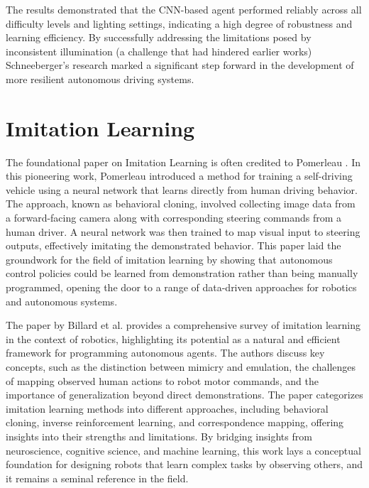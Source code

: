 The results demonstrated that the CNN-based agent performed reliably across all difficulty levels and lighting settings, indicating a high degree of robustness and learning efficiency. By successfully addressing the limitations posed by inconsistent illumination (a challenge that had hindered earlier works) Schneeberger’s \autocite{schneeberger2024end} research marked a significant step forward in the development of more resilient autonomous driving systems.

\section{Imitation Learning}
The foundational paper on Imitation Learning is often credited to Pomerleau \autocite{NIPS1988_812b4ba2}. In this pioneering work, Pomerleau introduced a method for training a self-driving vehicle using a neural network that learns directly from human driving behavior. The approach, known as behavioral cloning, involved collecting image data from a forward-facing camera along with corresponding steering commands from a human driver. A neural network was then trained to map visual input to steering outputs, effectively imitating the demonstrated behavior. This paper laid the groundwork for the field of imitation learning by showing that autonomous control policies could be learned from demonstration rather than being manually programmed, opening the door to a range of data-driven approaches for robotics and autonomous systems.

The paper by Billard et al. \autocite{bakker1996robot} provides a comprehensive survey of imitation learning in the context of robotics, highlighting its potential as a natural and efficient framework for programming autonomous agents. The authors discuss key concepts, such as the distinction between mimicry and emulation, the challenges of mapping observed human actions to robot motor commands, and the importance of generalization beyond direct demonstrations. The paper categorizes imitation learning methods into different approaches, including behavioral cloning, inverse reinforcement learning, and correspondence mapping, offering insights into their strengths and limitations. By bridging insights from neuroscience, cognitive science, and machine learning, this work lays a conceptual foundation for designing robots that learn complex tasks by observing others, and it remains a seminal reference in the field.

